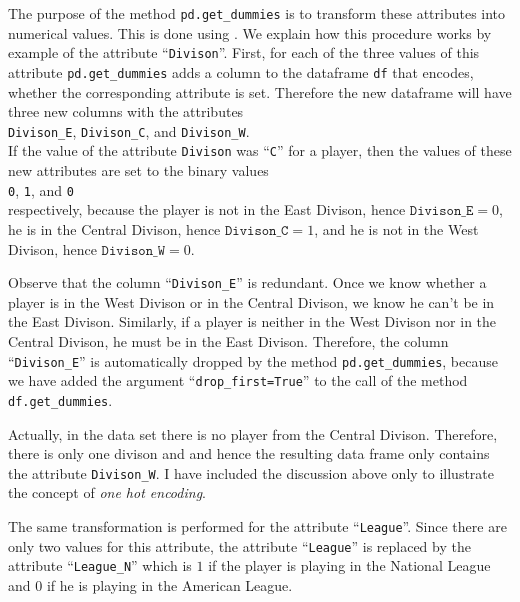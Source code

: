 \begin{enumerate}
      The purpose of the method \texttt{pd.get\_dummies} is to transform these attributes into numerical
      values.  This is done using .  We explain how this
      procedure works by example of the attribute ``\texttt{Divison}''.  First, for each of the three values of
      this attribute \texttt{pd.get\_dummies} adds a column to the dataframe \texttt{df} that encodes, whether
      the corresponding attribute is set.  Therefore the new dataframe will have three new columns with the attributes
      \\[0.2cm]
      \hspace*{1.3cm}
      \texttt{Divison\_E}, \texttt{Divison\_C}, and \texttt{Divison\_W}.
      \\[0.2cm]
      If the value of the attribute \texttt{Divison} was ``\texttt{C}'' for a player, then the values of
      these new attributes are set to the binary values
      \\[0.2cm]
      \hspace*{1.3cm}
      \texttt{0}, \texttt{1}, and \texttt{0}
      \\[0.2cm]
      respectively, because the player is not in the East Divison, hence $\texttt{Divison\_E} = 0$,
      he is in the Central Divison, hence $\texttt{Divison\_C} = 1$, and he is not in the West Divison, hence
      $\texttt{Divison\_W} = 0$.

      Observe that the column ``\texttt{Divison\_E}'' is redundant.  Once we know whether a player is in the
      West Divison or in the Central Divison, we know he can't be in the East Divison.  Similarly, if a player
      is neither in the West Divison nor in the Central Divison, he must be in the East Divison.  Therefore,
      the column ``\texttt{Divison\_E}'' is automatically dropped by the method \texttt{pd.get\_dummies},
      because we have added the argument ``\texttt{drop\_first=True}'' to the call of the method
      \texttt{df.get\_dummies}.

      Actually, in the data set there is no player from the Central Divison.  Therefore, there is only one
      divison and and hence the resulting data frame only contains the attribute \texttt{Divison\_W}.
      I have included the discussion above only to illustrate the concept of \emph{one hot encoding}.
      
      The same transformation is performed for the attribute ``\texttt{League}''.  Since there are only two
      values for this attribute, the attribute  ``\texttt{League}'' is replaced by the attribute
      ``\texttt{League\_N}'' which is $1$ if the player is playing in the National League and $0$ if he is
      playing in the American League.
\end{enumerate}

